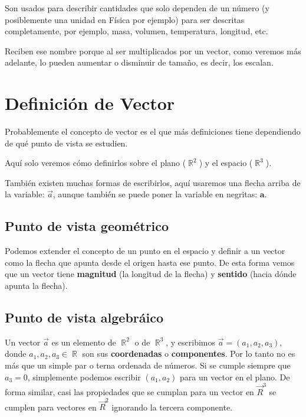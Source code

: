 \documentclass[12pt, fleqn]{report}                             %
\DeclareMathOperator \Reals        {\mathbb{R}}                 %
\newcommand{\bVec}[1]{\mathbf{#1}}                              %
\begin{document}
            Son usados para describir cantidades que solo dependen de un número (y posiblemente una
            unidad en Física por ejemplo) para ser descritas completamente, por ejemplo, masa,
            volumen, temperatura, longitud, etc.

            Reciben ese nombre porque al ser multiplicados por un vector, como veremos más adelante,
            lo pueden aumentar o disminuir de tamaño, es decir, los escalan.
        

        \vspace{2em}
        \section{Definición de Vector}
        
            Probablemente el concepto de vector es el que más definiciones tiene dependiendo de qué
            punto de vista se estudien.

            Aquí solo veremos cómo definirlos sobre el plano ($\Reals^2$) y el espacio ($\Reals^3$).

            También existen muchas formas de escribirlos, aquí usaremos una flecha arriba de la variable:
            $\vec{a}$, aunque también se puede poner la variable en negritas: $\bVec{a}$.
        
            \subsection{Punto de vista geométrico}
            
            Podemos extender el concepto de un punto en el espacio y definir a un vector como la flecha que apunta desde el origen hasta ese punto. De esta forma vemos que un vector tiene \textbf{magnitud} (la longitud de la flecha) y \textbf{sentido} (hacia dónde apunta la flecha).
            
            \subsection{Punto de vista algebráico}
            
            Un vector \(\vec{a}\) es un elemento de \(\Reals^2\) o de \(\Reals^3\), y escribimos \(\vec{a}=(a_1, a_2, a_3)\), donde $a_1, a_2, a_3 \in \Reals$ son sus \textbf{coordenadas} o \textbf{componentes}. Por lo tanto no es más que un simple par o terna ordenada de números. Si se cumple siempre que $a_3=0$, simplemente podemos escribir $(a_1, a_2)$ para un vector en el plano. De forma similar, casi las propiedades que se cumplan para un vector en $\vec{R}^3$ se cumplen para vectores en $\vec{R}^2$ ignorando la tercera componente.
            
\end{document}
